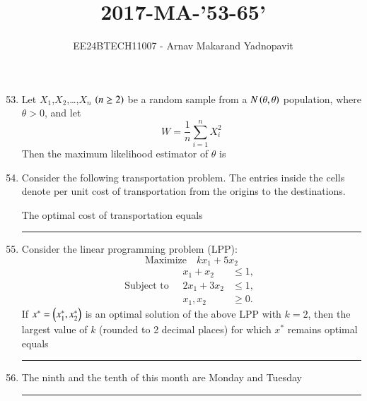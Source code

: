 \documentclass[journal,12pt,onecolumn]{IEEEtran}
\theoremstyle{remark}
\begin{document}
\title{2017-MA-'53-65'}
\author{EE24BTECH11007 - Arnav Makarand Yadnopavit}
\maketitle
\renewcommand{\thefigure}{\theenumi}
\renewcommand{\thetable}{\theenumi}
\begin{enumerate}
\setcounter{enumi}{52}
\item Let $X_1$,$X_2$,\dots,$X_n$ $\left(n\geq2\right)$ be a random sample from a $N\left(\theta,\theta\right)$ population, where $\theta>0$, and let 
\[
W=\frac{1}{n}\sum_{i=1}^n X_i^2
\]
Then the maximum likelihood estimator of $\theta$ is
\begin{enumerate}
\end{enumerate}
\item Consider the following transportation problem. The entries inside the cells denote per unit cost of transportation from the origins to the destinations.
\begin{figure}[H]
    \centering
    
\end{figure}
The optimal cost of transportation equals \rule{2cm}{0.15mm}
\item Consider the linear programming problem (LPP):
\[
\text{Maximize} \quad kx_1 + 5x_2
\]
\[
\text{Subject to} \quad 
\begin{aligned}
    x_1 + x_2 &\leq 1, \\
    2x_1 + 3x_2 &\leq 1, \\
    x_1, x_2 &\geq 0.
\end{aligned}
\]
If $x^*=\left(x^*_1,x^*_2\right)$ is an optimal solution of the above LPP with $k=2$, then the largest value of $k$ (rounded to 2 decimal places) for which $x^*$ remains optimal equals \rule{2cm}{0.15mm} 
\item  The ninth and the tenth of this month are Monday and Tuesday \rule{2cm}{0.15mm}
\begin{enumerate}
\end{enumerate}
\end{enumerate}
\end{document}
